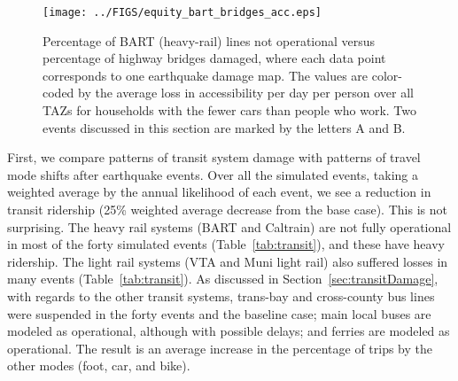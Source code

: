





\begin{figure}[h]
\centering
\texttt{[image: ../FIGS/equity\_bart\_bridges\_acc.eps]} 
\caption{Percentage of BART (heavy-rail) lines not operational versus percentage of highway bridges damaged, where each data point corresponds to one earthquake damage map. The values are color-coded by the average loss in accessibility per day per person over all TAZs for households with the fewer cars than people who work. Two events discussed in this section are marked by the letters A and B.}
\label{fig:bartBri}
\end{figure}



First, we compare patterns of transit system damage with patterns of travel mode shifts after earthquake events. Over all the simulated events, taking a weighted average by the annual likelihood of each event, we see a reduction in transit ridership (25\% weighted average decrease from the base case). This is not surprising. The heavy rail systems (BART and Caltrain) are not fully operational in most of the forty simulated events (Table~\ref{tab:transit}), and these have heavy ridership. The light rail systems (VTA and Muni light rail) also suffered losses in many events (Table~\ref{tab:transit}). As discussed in Section~\ref{sec:transitDamage}, with regards to the other transit systems, trans-bay and cross-county bus lines were suspended in the forty events and the baseline case; main local buses are modeled as operational, although with possible delays; and ferries are modeled as operational.
 The result is an average increase in the percentage of trips by the other modes (foot, car, and bike). 

